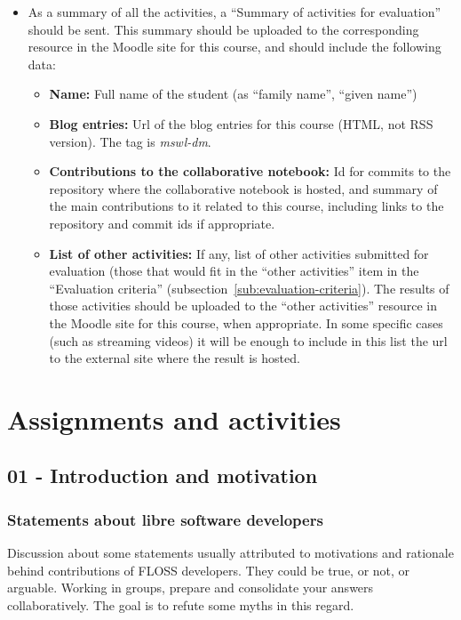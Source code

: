 \documentclass[a4paper]{article}
\begin{document}
\begin{itemize}
\item As a summary of all the activities, a ``Summary of activities for evaluation'' should be sent. This summary should be uploaded to the corresponding resource in the Moodle site for this course, and should include the following data:
  \begin{itemize}
  \item \textbf{Name:} Full name of the student (as ``family name'', ``given name'')
  \item \textbf{Blog entries:} Url of the blog entries for this course (HTML, not RSS version). The tag is \textit{mswl-dm}.
  \item \textbf{Contributions to the collaborative notebook:} Id for commits to the repository where the collaborative notebook is hosted, and summary of the main contributions to it related to this course, including links to the repository and commit ids if appropriate.
  \item \textbf{List of other activities:} If any, list of other activities submitted for evaluation (those that would fit in the ``other activities'' item in the ``Evaluation criteria'' (subsection~\ref{sub:evaluation-criteria}). The results of those activities should be uploaded to the ``other activities'' resource in the Moodle site for this course, when appropriate. In some specific cases (such as streaming videos) it will be enough to include in this list the url to the external site where the result is hosted.
  \end{itemize}
\end{itemize}

\section{Assignments and activities}

\subsection{01 - Introduction and motivation}


\subsubsection{Statements about libre software developers}
\label{sub:statements-devs}
Discussion about some statements usually attributed to motivations and rationale behind contributions of FLOSS developers. 
They could be true, or not, or arguable. Working in groups, prepare and consolidate your answers collaboratively. The goal is to refute some myths in this regard.
\end{document}
